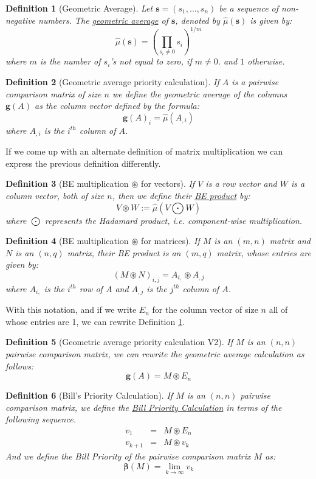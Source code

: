 \documentclass{article}
\newtheorem{definition}{Definition}
\begin{document}
\begin{definition}[Geometric Average]
\label{def:geomavg1}
	Let $\mathbf{s}=(s_1, \ldots, s_n)$ be a sequence of non-negative
	numbers.  The \ul{geometric average} of $\mathbf{s}$, denoted by
	$\widehat{\mu}(\mathbf{s})$ is given by:
	$$\widehat{\mu}(\mathbf{s}) =
	\left(\prod_{s_i \neq 0}s_i\right)^{1/m}$$
	where $m$ is the number of $s_i$'s not equal to zero, if $m\neq 0$.
	and $1$ otherwise.
\end{definition}

\begin{definition}[Geometric average priority calculation]
	If $A$ is a pairwise comparison matrix of size $n$ we define the geometric
	average of the columns $\mathbf{g}(A)$ as the column vector
	defined by the formula:
	$$\mathbf{g}(A)_{i} = \widehat{\mu}(A_{,i})$$
	where $A_{,i}$ is the $i^{th}$ column of $A$.
\end{definition}

If we come up with an alternate definition of matrix multiplication
we can express the previous definition differently.

\begin{definition}[BE multiplication $\circledast$ for vectors]
	If $V$ is a row vector and $W$ is a column vector, both of size
	$n$, then we define their \ul{BE product} by:
	$$V \circledast W := \widehat{\mu}(V \bigodot W)$$
	where $\bigodot$ represents the Hadamard product, i.e.
	component-wise multiplication.
\end{definition}

\begin{definition}[BE multiplication $\circledast$ for matrices]
	If $M$ is an $(m,n)$ matrix and $N$ is an $(n,q)$ matrix, their
	BE product is an $(m,q)$ matrix, whose entries are given by:
	$$
	\left(M \circledast N\right)_{i,j} =
	A_{i,} \circledast A_{, j}
	$$
	where $A_{i,}$ is the $i^{th}$ row of $A$ and $A_{,j}$ is the
	$j^{th}$ column of $A$.
\end{definition}

With this notation, and if we write $E_n$ for the column vector of
size $n$ all of whose entries are 1, we can rewrite Definition
\ref{def:geomavg1}.

\begin{definition}[Geometric average priority calculation V2]
	If $M$ is an $(n,n)$ pairwise comparison matrix, we can rewrite
	the geometric average calculation as follows:
	$$
	\mathbf{g}(A) = M \circledast E_n
	$$
\end{definition}

\begin{definition}[Bill's Priority Calculation]
	If $M$ is an $(n,n)$ pairwise comparison matrix, we define the
	\ul{Bill Priority Calculation} in terms of the following sequence.
	\begin{eqnarray*}
		v_1 &=& M \circledast E_n \\
		v_{k+1} &=& M \circledast v_k
	\end{eqnarray*}
	And we define the Bill Priority of the pairwise comparison
	matrix $M$ as:
	$$\mathbf{\beta}(M) = \lim_{k \to \infty} v_k$$
\end{definition}
\end{document}
